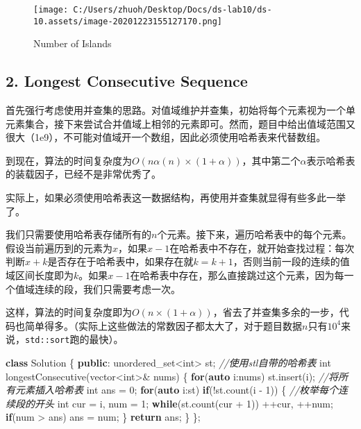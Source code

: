 \documentclass[]{article}
\newenvironment{Shaded}{}{}
\newcommand{\CommentTok}[1]{\textcolor[rgb]{0.38,0.63,0.69}{\textit{#1}}}
\newcommand{\ControlFlowTok}[1]{\textcolor[rgb]{0.00,0.44,0.13}{\textbf{#1}}}
\newcommand{\DataTypeTok}[1]{\textcolor[rgb]{0.56,0.13,0.00}{#1}}
\newcommand{\DecValTok}[1]{\textcolor[rgb]{0.25,0.63,0.44}{#1}}
\newcommand{\KeywordTok}[1]{\textcolor[rgb]{0.00,0.44,0.13}{\textbf{#1}}}
\newcommand{\NormalTok}[1]{#1}
\begin{document}
\begin{figure}
    \centering
    \texttt{[image: C:/Users/zhuoh/Desktop/Docs/ds-lab10/ds-10.assets/image-20201223155127170.png]}
    \caption{Number of Islands}
\end{figure}

\hypertarget{header-n34}{%
\subsection{2. Longest Consecutive Sequence}\label{header-n34}}

首先强行考虑使用并查集的思路。对值域维护并查集，初始将每个元素视为一个单元素集合，接下来尝试合并值域上相邻的元素即可。然而，题目中给出值域范围又很大（1e9），不可能对值域开一个数组，因此必须使用哈希表来代替数组。

到现在，算法的时间复杂度为\(O(n\alpha(n) \times (1 + \alpha))\)，其中第二个\(\alpha\)表示哈希表的装载因子，已经不是非常优秀了。

实际上，如果必须使用哈希表这一数据结构，再使用并查集就显得有些多此一举了。

我们只需要使用哈希表存储所有的\(n\)个元素。接下来，遍历哈希表中的每个元素。假设当前遍历到的元素为\(x\)，如果\(x-1\)在哈希表中不存在，就开始查找过程：每次判断\(x+k\)是否存在于哈希表中，如果存在就\(k = k + 1\)，否则当前一段的连续的值域区间长度即为\(k\)。如果\(x-1\)在哈希表中存在，那么直接跳过这个元素，因为每一个值域连续的段，我们只需要考虑一次。

这样，算法的时间复杂度即为\(O(n\times(1 + \alpha))\)，省去了并查集多余的一步，代码也简单得多。（实际上这些做法的常数因子都太大了，对于题目数据\(n\)只有\(10^4\)来说，\texttt{std::sort}跑的最快）。

\begin{Shaded}
\begin{Highlighting}[]
\KeywordTok{class}\NormalTok{ Solution \{}
\KeywordTok{public}\NormalTok{:}
\NormalTok{    unordered_set<}\DataTypeTok{int}\NormalTok{> st; }\CommentTok{//使用stl自带的哈希表}
    \DataTypeTok{int}\NormalTok{ longestConsecutive(vector<}\DataTypeTok{int}\NormalTok{>& nums) \{}
        \ControlFlowTok{for}\NormalTok{(}\KeywordTok{auto}\NormalTok{ i:nums) st.insert(i); }\CommentTok{//将所有元素插入哈希表}
        \DataTypeTok{int}\NormalTok{ ans = }\DecValTok{0}\NormalTok{;}
        \ControlFlowTok{for}\NormalTok{(}\KeywordTok{auto}\NormalTok{ i:st) }\ControlFlowTok{if}\NormalTok{(!st.count(i - }\DecValTok{1}\NormalTok{)) \{}
            \CommentTok{//枚举每个连续段的开头}
            \DataTypeTok{int}\NormalTok{ cur = i, num = }\DecValTok{1}\NormalTok{;}
            \ControlFlowTok{while}\NormalTok{(st.count(cur + }\DecValTok{1}\NormalTok{)) ++cur, ++num;}
            \ControlFlowTok{if}\NormalTok{(num > ans) ans = num;}
\NormalTok{        \}}
        \ControlFlowTok{return}\NormalTok{ ans;}
\NormalTok{    \}}
\NormalTok{\};}
\end{Highlighting}
\end{Shaded}
\end{document}
